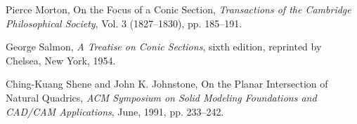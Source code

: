 \begin{thebibliography}{999}
     Pierce Morton,
     On the Focus of a Conic Section,
     {\em Transactions of the Cambridge Philosophical Society},
     Vol. 3 (1827--1830), pp. 185--191.

     George Salmon,
     {\em A Treatise on Conic Sections},
     sixth edition,
     reprinted by Chelsea, New York, 1954.

     Ching-Kuang Shene and John K. Johnstone,
     On the Planar Intersection of Natural Quadrics,
     {\em ACM Symposium on Solid Modeling Foundations and
     CAD/CAM Applications}, 
     June, 1991, pp. 233--242.

\end{thebibliography}


